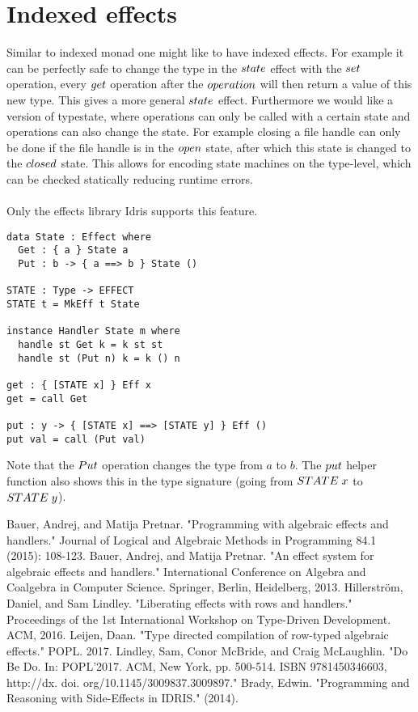\documentclass[12pt]{article}
\begin{document}
\section{Indexed effects}
Similar to indexed monad one might like to have indexed effects. For example it can be perfectly safe to change the type in the $\mathnormal{state}$ effect with the $\mathnormal{set}$ operation, every $\mathnormal{get}$ operation after the $\mathnormal{operation}$ will then return a value of this new type. This gives a more general $\mathnormal{state}$ effect.
Furthermore we would like a version of typestate, where operations can only be called with a certain state and operations can also change the state. For example closing a file handle can only be done if the file handle is in the $\mathnormal{open}$ state, after which this state is changed to the $\mathnormal{closed}$ state. This allows for encoding state machines on the type-level, which can be checked statically reducing runtime errors.
\\\\
Only the effects library Idris supports this feature.
\begin{lstlisting}
data State : Effect where
  Get : { a } State a
  Put : b -> { a ==> b } State ()

STATE : Type -> EFFECT
STATE t = MkEff t State

instance Handler State m where
  handle st Get k = k st st
  handle st (Put n) k = k () n

get : { [STATE x] } Eff x
get = call Get

put : y -> { [STATE x] ==> [STATE y] } Eff ()
put val = call (Put val)
\end{lstlisting}
Note that the $\mathnormal{Put}$ operation changes the type from $a$ to $b$. The $\mathnormal{put}$ helper function also shows this in the type signature (going from $\mathnormal{STATE}\; x$ to $\mathnormal{STATE}\;y$).

\begin{thebibliography}{9}
Bauer, Andrej, and Matija Pretnar. "Programming with algebraic effects and handlers." Journal of Logical and Algebraic Methods in Programming 84.1 (2015): 108-123.
Bauer, Andrej, and Matija Pretnar. "An effect system for algebraic effects and handlers." International Conference on Algebra and Coalgebra in Computer Science. Springer, Berlin, Heidelberg, 2013.
Hillerstr\"{o}m, Daniel, and Sam Lindley. "Liberating effects with rows and handlers." Proceedings of the 1st International Workshop on Type-Driven Development. ACM, 2016.
Leijen, Daan. "Type directed compilation of row-typed algebraic effects." POPL. 2017.
Lindley, Sam, Conor McBride, and Craig McLaughlin. "Do Be Do. In: POPL'2017. ACM, New York, pp. 500-514. ISBN 9781450346603, http://dx. doi. org/10.1145/3009837.3009897."
Brady, Edwin. "Programming and Reasoning with Side-Effects in IDRIS." (2014).

\end{thebibliography}
\end{document}
